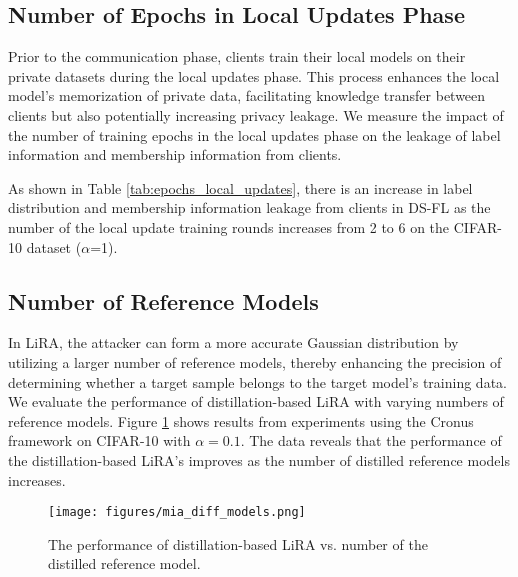 \subsection{Number of Epochs in Local Updates Phase}
Prior to the communication phase, clients train their local models on their private datasets during the local updates phase. 
This process enhances the local model's memorization of private data, facilitating knowledge transfer between clients but also potentially increasing privacy leakage. 
We measure the impact of the number of training epochs in the local updates phase on the leakage of label information and membership information from clients.
\begin{table}[h]
    \caption{Impact of Number of Training Epochs on Label Distribution and Membership Information Leakage in PDA-FD.}
    \centering
    \scriptsize
    \label{tab:epochs_local_updates}
\end{table}
As shown in Table \ref{tab:epochs_local_updates}, there is an increase in label distribution and membership information leakage from clients in DS-FL as the number of the local update training rounds increases from 2 to 6 on the CIFAR-10 dataset ($\alpha$=1).


\subsection{Number of Reference Models}
In LiRA, the attacker can form a more accurate Gaussian distribution by utilizing a larger number of reference models, thereby enhancing the precision of determining whether a target sample belongs to the target model's training data. 
We evaluate the performance of distillation-based LiRA with varying numbers of reference models. 
Figure \ref{fig:distillation_lira_num_models} shows results from experiments using the Cronus framework on CIFAR-10 with $\alpha=0.1$. 
The data reveals that the performance of the distillation-based LiRA's improves as the number of distilled reference models increases.
\begin{figure}[h]
    \centering
    \texttt{[image: figures/mia\_diff\_models.png]}
    \caption{The performance of distillation-based LiRA vs. number of the distilled reference model.}
    \label{fig:distillation_lira_num_models}
\end{figure}


